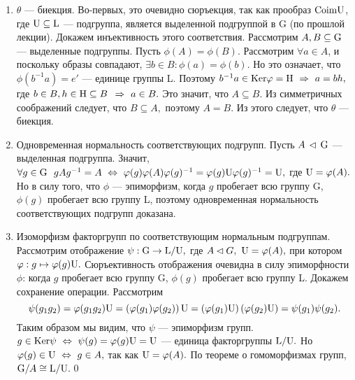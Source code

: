 \dok \begin{enumerate}
    \item $\theta$ --- биекция. Во-первых, это очевидно сюръекция, так как прообраз ${\rm Coim}{\rm U}$, где ${\rm U}\subseteq{\rm L}$ --- подгруппа, является
    выделенной подгруппой в \rr G (по прошлой лекции). Докажем инъективность этого соответствия. Рассмотрим $A, B\subseteq{\rm G}$ --- выделенные подгруппы.
    Пусть $\phi(A)=\phi(B).$ Рассмотрим $\forall a\in A$, и поскольку образы совпадают, $\exists b\in B : \phi(a)=\phi(b).$ Но это означает, что $\phi(b^{-1}a)=e'$ --- единице группы \rr L.
    Поэтому $b^{-1}a\in{\rm Ker}\varphi={\rm H}\ \Rightarrow\  a=bh,$ где $b\in B, h\in{\rm H}\subseteq B$ $\ \Rightarrow\  a\in B.$ Это значит, что $A\subseteq B.$ Из симметричных соображений следует, что
    $B\subseteq A,$ поэтому $A=B.$ Из этого следует, что $\theta$ --- биекция.
    \item Одновременная нормальность соответствующих подгрупп. Пусть $A\, \lhd\, {\rm G}$ --- выделенная подгруппа. Значит, $\forall g\in{\rm G}\  \ gAg^{-1}=A\ \Leftrightarrow\ 
    \varphi(g)\varphi(A)\varphi(g)^{-1}=\varphi(g){\rm U}\varphi(g)^{-1}={\rm U},$ где ${\rm U}=\varphi(A).$ Но в силу того, что $\phi$ --- эпиморфизм, когда $g$ пробегает всю группу \rr G,
    $\phi(g)$ пробегает всю группу \rr L, поэтому одновременная нормальность соответствующих подгрупп доказана.
    \item Изоморфизм факторгрупп по соответствующим нормальным подгруппам. Рассмотрим отображение $\psi : {\rm G}\rightarrow {\rm L}/{\rm U},$ где $A\lhd G,\ {\rm U}=\varphi(A),$ при котором
    $\varphi : g\mapsto\varphi(g){\rm U}.$ Сюръективность отображения очевидна в силу эпиморфности $\phi$: когда $g$ пробегает всю группу \rr G,
    $\phi(g)$ пробегает всю группу \rr L. Докажем сохранение операции. Рассмотрим
    $$
    \psi(g_1g_2)=\varphi(g_1g_2){\rm U}=\left(\varphi(g_1)\varphi(g_2)\right){\rm U}=\left(\varphi(g_1){\rm U}\right)\left(\varphi(g_2){\rm U}\right)=\psi(g_1)\psi(g_2).
    $$
    Таким образом мы видим, что $\psi$ --- эпиморфизм групп. $g\in{\rm Ker}\psi\ \Leftrightarrow\ \psi(g)=\varphi(g){\rm U}={\rm U}$ --- единица факторгруппы ${\rm L}/{\rm U}.$ Но
    $\varphi(g)\in {\rm U}\ \Leftrightarrow\  g\in A,$ так как ${\rm U}=\varphi(A).$ По теореме о гомоморфизмах групп, ${\rm G}/A\cong{\rm L}/{\rm U}.$\quad\qed
\end{enumerate}



